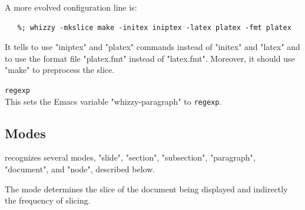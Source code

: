 \documentclass[12pt]{article}
\begin{document}
\begin{description}
A more evolved configuration line is:
\begin{verbatim}
   %; whizzy -mkslice make -initex iniptex -latex platex -fmt platex
\end{verbatim}
It tells {\whizzy} to use \lst"iniptex" and \lst"platex" commands instead
of \lst"initex" and \lst"latex" and to use the format file \lst"platex.fmt"
instead of \lst"latex.fmt". Moreover, it should use \lst"make" to preprocess
the slice.

\item[whizzy-paragraph] \texttt{regexp}\\
This sets the Emacs variable \lst"whizzy-paragraph" to \texttt{regexp}.
\end{description}


\subsection {Modes}
\label {modes}

{\whizzy} recognizes several modes,
\lst"slide",
\lst"section",
\lst"subsection",
\lst"paragraph",
\lst"document", and
\lst"node", described below.

The mode determines the slice of the document being displayed and indirectly
the frequency of slicing.
\end{document}
